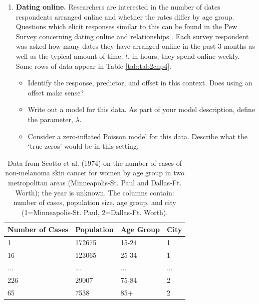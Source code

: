 \documentclass[
]{krantz}
\providecommand{\tightlist}{%
  \setlength{\itemsep}{0pt}\setlength{\parskip}{0pt}}
\begin{document}
\begin{enumerate}
\def\labelenumi{\arabic{enumi}.}
\setcounter{enumi}{14}
\item
  \textbf{Dating online.} Researchers are interested in the number of dates respondents arranged online and whether the rates differ by age group. Questions which elicit responses similar to this can be found in the Pew Survey concerning dating online and relationships \citep{Duggan2013}. Each survey respondent was asked how many dates they have arranged online in the past 3 months as well as the typical amount of time, \(t\), in hours, they spend online weekly. Some rows of data appear in Table \ref{tab:tab2chp4}.

  \begin{itemize}
  \tightlist
  \item
    Identify the response, predictor, and offset in this context. Does using an offset make sense?
  \item
    Write out a model for this data. As part of your model description, define the parameter, \(\lambda\).
  \item
    Consider a zero-inflated Poisson model for this data. Describe what the `true zeros' would be in this setting.
  \end{itemize}
\end{enumerate}

\begin{table}

\caption{\label{tab:tab3chp4}Data from Scotto et al. (1974) on the number of cases of non-melanoma skin cancer for women by age group in two metropolitan areas (Minneapolis-St. Paul and Dallas-Ft. Worth); the year is unknown. The columns contain: number of cases, population size, age group, and city (1=Minneapolis-St. Paul, 2=Dallas-Ft. Worth).}
\centering
\begin{tabular}[t]{llll}
\toprule
Number of Cases & Population & Age Group & City\\
\midrule
1 & 172675 & 15-24 & 1\\
16 & 123065 & 25-34 & 1\\
... & ... & ... & ...\\
226 & 29007 & 75-84 & 2\\
65 & 7538 & 85+ & 2\\
\bottomrule
\end{tabular}
\end{table}
\end{document}
